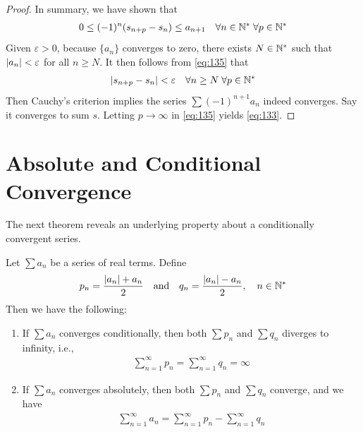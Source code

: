 \documentclass[thmcnt=section, 12pt]{my-elegantbook}
\begin{document}
\begin{proof}
	In summary, we have shown that 
	\begin{align}
		0 \leq (-1)^n (s_{n+p} - s_{n}) \leq a_{n+1}
		\quad \forall n \in \mathbb{N}^\ast \; 
		\forall p \in \mathbb{N}^\ast 
		\label{eq:135}
	\end{align}
	Given $\varepsilon > 0$,
	because $\{a_n\}$ converges to zero,
	there exists $N \in \mathbb{N}^\ast$ such that 
	$\left\lvert a_n \right\rvert < \varepsilon$ for all $n \geq N$.
	It then follows from \eqref{eq:135} that 
	\begin{align*}
		\left\lvert s_{n+p} - s_n \right\rvert < \varepsilon
		\quad \forall n \geq N \; 
		\forall p \in \mathbb{N}^\ast
	\end{align*}
	Then Cauchy's criterion implies 
	the series $\sum (-1)^{n+1} a_n$ indeed converges.
	Say it converges to sum $s$.
	Letting $p \to \infty$ in \eqref{eq:135} yields \eqref{eq:133}.
\end{proof}


\section{Absolute and Conditional Convergence}


The next theorem reveals an underlying property
about a conditionally convergent series.

\begin{theorem} \label{thm:71}
	Let $\sum a_n$ be a series of real terms.
	Define 
	\begin{align*}
		p_n = \frac{\left\lvert a_n \right\rvert + a_n}{2}
		\quad \text{and} \quad 
		q_n = \frac{\left\lvert a_n \right\rvert - a_n}{2},
		\quad n \in \mathbb{N}^\ast
	\end{align*}
	Then we have the following:
	\begin{enumerate}
		\item If $\sum a_n$ converges conditionally, 
			then both $\sum p_n$ and $\sum q_n$ diverges to infinity,
			i.e., 
			\begin{align}
				\sum_{n=1}^\infty p_n
				= \sum_{n=1}^\infty q_n
				= \infty
				\label{eq:136}
			\end{align}
		\item If $\sum a_n$ converges absolutely,
			then both $\sum p_n$ and $\sum q_n$ converge,
			and we have 
			\begin{align}
				\sum_{n=1}^\infty a_n 
				= \sum_{n=1}^\infty p_n 
				- \sum_{n=1}^\infty q_n
				\label{eq:137}
			\end{align}	
	\end{enumerate}
\end{theorem}
\end{document}
